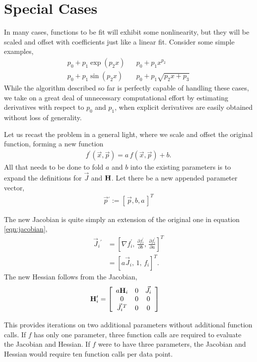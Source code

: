 \documentclass{article}
\def\x{\vec{x}}
\def\p{\vec{p}}
\def\J{\vec{J}}
\def\H{{\bf H}}
\begin{document}
\section{Special Cases}
In many cases, functions to be fit will exhibit some nonlinearity, but they will be scaled and offset with coefficients just like a linear fit.  Consider some simple examples,
\begin{align}
p_0 + p_1 \exp\left(p_2 x\right) & & p_0 + p_1 x ^{p_2}\nonumber\\
p_0 + p_1 \sin\left(p_2 x\right) & & p_0 + p_1 \sqrt{p_2 x + p_3}\nonumber
\end{align}
While the algorithm described so far is perfectly capable of handling these cases, we take on a great deal of unnecessary computational effort by estimating derivatives with respect to $p_0$ and $p_1$, when explicit derivatives are easily obtained without loss of generality.

Let us recast the problem in a general light, where we scale and offset the original function, forming a new function
\begin{align}
f^\prime(\x,\p) = a\,f(\x,\p) + b.
\end{align}
All that needs to be done to fold $a$ and $b$ into the existing parameters is to expand the definitions for $\J$ and $\H$.  Let there be a new appended parameter vector,
\begin{align}
\p{^\prime} := [\,\p, b, a\,]^T
\end{align}

The new Jacobian is quite simply an extension of the original one in equation \ref{eqn:jacobian},
\begin{align}
\J_i{^\prime} &= \left[ \nabla f_i^\prime,\, \frac{\partial f_i^\prime}{\partial b},\, \frac{\partial f_i^\prime}{\partial a} \right]^T\nonumber\\
 &= \left[ a\J_i,\, 1,\, f_i \right]^T.
\end{align}
The new Hessian follows from the Jacobian,
\begin{align}
\H_i^\prime &= \left[ \begin{array}{ccc}
a\H_i & 0 & \J_i\\
0 & 0 & 0\\
\J_i{^T} & 0 & 0
\end{array}\right]
\end{align}

This provides iterations on two additional parameters without additional function calls.  If $f$ has only one parameter, three function calls are required to evaluate the Jacobian and Hessian.  If $f$ were to have three parameters, the Jacobian and Hessian would require ten function calls per data point.
\end{document}
